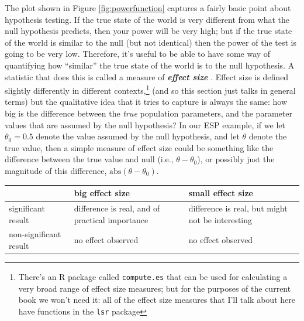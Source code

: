 \documentclass[
]{book}
\begin{document}
The plot shown in Figure \ref{fig:powerfunction} captures a fairly basic point about hypothesis testing. If the true state of the world is very different from what the null hypothesis predicts, then your power will be very high; but if the true state of the world is similar to the null (but not identical) then the power of the test is going to be very low. Therefore, it's useful to be able to have some way of quantifying how ``similar'' the true state of the world is to the null hypothesis. A statistic that does this is called a measure of \textbf{\emph{effect size}} \citep[e.g.][]{Cohen1988, Ellis2010}. Effect size is defined slightly differently in different contexts,\footnote{There's an R package called \texttt{compute.es} that can be used for calculating a very broad range of effect size measures; but for the purposes of the current book we won't need it: all of the effect size measures that I'll talk about here have functions in the \texttt{lsr} package} (and so this section just talks in general terms) but the qualitative idea that it tries to capture is always the same: how big is the difference between the \emph{true} population parameters, and the parameter values that are assumed by the null hypothesis? In our ESP example, if we let \(\theta_0 = 0.5\) denote the value assumed by the null hypothesis, and let \(\theta\) denote the true value, then a simple measure of effect size could be something like the difference between the true value and null (i.e., \(\theta - \theta_0\)), or possibly just the magnitude of this difference, \(\mbox{abs}(\theta - \theta_0)\).

\begin{tabular}{l|l|l}
\hline
 & big effect size & small effect size\\
\hline
significant result & difference is real, and  of practical importance & difference is real, but might not be interesting\\
\hline
non-significant result & no effect observed & no effect observed\\
\hline
\end{tabular}
\end{document}
